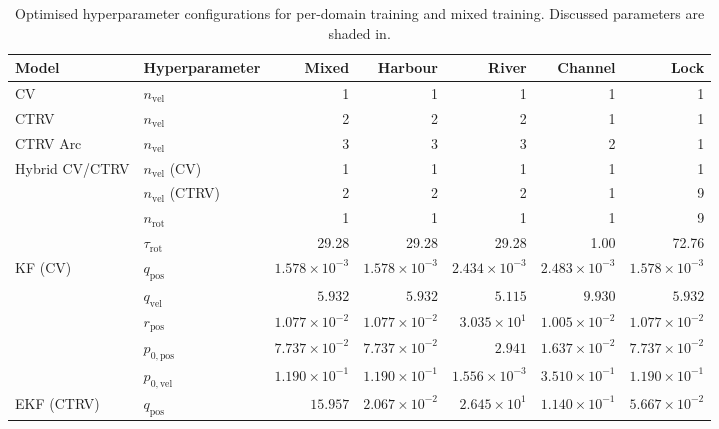 \begin{table}[t]
\centering
\caption[Exp. II Optimised hyperparameter configurations]{Optimised hyperparameter configurations for per-domain training and mixed training. Discussed parameters are shaded in.}
\label{tab:hpo_results_merged}
\small
\setlength{\tabcolsep}{3pt}
\begin{tabular}{llrrrrr}
\toprule
\textbf{Model} & \textbf{Hyperparameter} & \textbf{Mixed} & \textbf{Harbour} & \textbf{River} & \textbf{Channel} & \textbf{Lock} \\
\midrule
CV             & $n_\text{vel}$        & 1      & 1     & 1     & 1     & 1     \\
CTRV           & $n_\text{vel}$        & 2      & 2     & 2     & \cellcolor{cyan!15}1     & 1     \\
CTRV Arc       & $n_\text{vel}$        & 3      & 3     & 3     & \cellcolor{cyan!15}2     & 1     \\
Hybrid CV/CTRV & $n_\text{vel}$ (CV)   & 1      & 1     & 1     & 1     & 1     \\
               & $n_\text{vel}$ (CTRV) & 2      & 2     & 2     & \cellcolor{cyan!15}1     & \cellcolor{orange!15}9     \\
               & $n_\text{rot}$        & 1      & 1     & 1     & 1     & \cellcolor{orange!15}9     \\
               & $\tau_\text{rot}$     & 29.28  & 29.28 & 29.28 & 1.00  & \cellcolor{orange!15}72.76 \\
\midrule
KF (CV)        & $q_\text{pos}$        & $1.578 \times 10^{-3}$ & $1.578 \times 10^{-3}$ & $2.434 \times 10^{-3}$ & $2.483 \times 10^{-3}$ & $1.578 \times 10^{-3}$ \\
               & $q_\text{vel}$        & $5.932$                & $5.932$                & $5.115$                & $9.930$                & $5.932$                \\
               & $r_\text{pos}$        & $1.077 \times 10^{-2}$ & $1.077 \times 10^{-2}$ & $3.035 \times 10^{1}$  & $1.005 \times 10^{-2}$ & $1.077 \times 10^{-2}$ \\
               & $p_{0,\text{pos}}$    & $7.737 \times 10^{-2}$ & $7.737 \times 10^{-2}$ & $2.941$                & $1.637 \times 10^{-2}$ & $7.737 \times 10^{-2}$ \\
               & $p_{0,\text{vel}}$    & $1.190 \times 10^{-1}$ & $1.190 \times 10^{-1}$ & $1.556 \times 10^{-3}$ & $3.510 \times 10^{-1}$ & $1.190 \times 10^{-1}$ \\
EKF (CTRV)     & $q_\text{pos}$        & $15.957$               & $2.067 \times 10^{-2}$ & $2.645 \times 10^{1}$  & $1.140 \times 10^{-1}$ & $5.667 \times 10^{-2}$ \\

\end{tabular}
\end{table}
